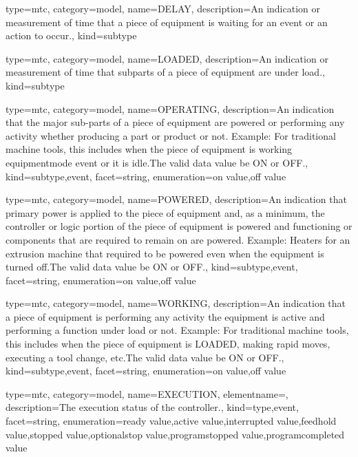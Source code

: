 {
  type=mtc,
  category=model,
  name={DELAY},
  description={An indication or measurement of time that a piece of equipment is waiting for an event or an action to occur.},
  kind={subtype}
}


{
  type=mtc,
  category=model,
  name={LOADED},
  description={An indication or measurement of time that subparts of a piece of equipment are under load.},
  kind={subtype}
}


{
  type=mtc,
  category=model,
  name={OPERATING},
  description={An indication that the major sub-parts of a piece of equipment are powered or performing any activity whether producing a part or product or not.   \newline Example: For traditional machine tools, this includes when the piece of equipment is \gls{working equipmentmode event} or it is idle.The \gls{valid data value} \must be ON or OFF.},
  kind={subtype,event},
  facet={\gls{string}},
  enumeration={\gls{on value},\gls{off value}}
}


{
  type=mtc,
  category=model,
  name={POWERED},
  description={An indication that primary power is applied to the piece of equipment and, as a minimum, the controller or logic portion of the piece of equipment is powered and functioning or components that are required to remain on are powered. Example: Heaters for an extrusion machine that required to be powered even when the equipment is turned off.The \gls{valid data value} \must be ON or OFF.},
  kind={subtype,event},
  facet={\gls{string}},
  enumeration={\gls{on value},\gls{off value}}
}


{
  type=mtc,
  category=model,
  name={WORKING},
  description={An indication that a piece of equipment is performing any activity  the equipment is active and performing a function under load or not. \newline Example: For traditional machine tools, this includes when the piece of equipment is LOADED, making rapid moves, executing a tool change, etc.The \gls{valid data value} \must be ON or OFF.},
  kind={subtype,event},
  facet={\gls{string}},
  enumeration={\gls{on value},\gls{off value}}
}


{
  type=mtc,
  category=model,
  name={EXECUTION},
  elementname=,
  description={The execution status of the \gls{controller}.},
  kind={type,event},
  facet={\gls{string}},
  enumeration={\gls{ready value},\gls{active value},\gls{interrupted value},\gls{feedhold value},\gls{stopped value},\gls{optionalstop value},\gls{programstopped value},\gls{programcompleted value}}
}


